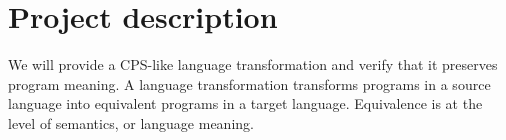 \documentclass[ms]{byuprop}
\newcounter{definition}
\newcounter{example}
\begin{document}










\section{Project description}

We will provide a CPS-like language transformation and verify that it preserves program meaning. A language transformation transforms programs in a source language into equivalent programs in a target language. Equivalence is at the level of semantics, or language meaning.
\end{document}
